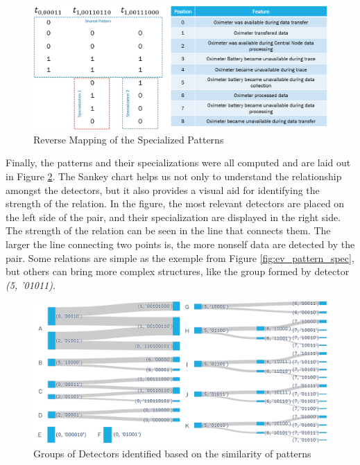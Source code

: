 \begin{figure}[!h]
	\centering
	\includegraphics[width=\textwidth, keepaspectratio]{img/pattern_specialization_reverse_map.png}
	\caption{Reverse Mapping of the Specialized Patterns}
	\label{fig:ev_pattern_spec_reverse_mapping}
\end{figure}


Finally, the patterns and their specializations were all computed and are laid out in Figure \ref{fig:ev_sankey}. The Sankey chart helps us not only to understand the relationship amongst the detectors, but it also provides a visual aid for identifying the strength of the relation. In the figure, the most relevant detectors are placed on the left side of the pair, and their specialization are displayed in the right side. The strength of the relation can be seen in the line that connects them. The larger the line connecting two points is, the more nonself data are detected by the pair. Some relations are simple as the exemple from Figure \ref{fig:ev_pattern_spec}, but others can bring more complex structures, like the group formed by detector \textit{(5, '01011)}.

\begin{figure}[]
	\centering
	\includegraphics[width=\textwidth, keepaspectratio]{img/sankey3.png}
	\caption{Groups of Detectors identified based on the similarity of patterns}
	\label{fig:ev_sankey}
\end{figure}


